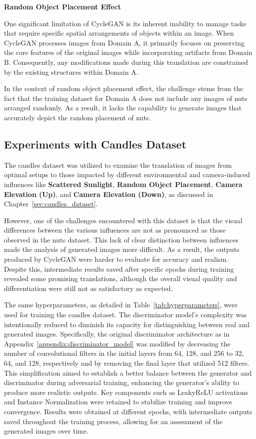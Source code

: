 \documentclass[12pt,DIV14,BCOR12mm,a4paper,footinclude=false,headinclude,parskip=half-,twoside,openright,cleardoublepage=empty,toc=index,bibliography=totoc,listof=totoc]{scrreprt}
\numberwithin{equation}{chapter}
\begin{document}
\textbf{Random Object Placement Effect}

One significant limitation of CycleGAN is its inherent inability to manage tasks that require specific spatial arrangements of objects within an image. When CycleGAN processes images from Domain A, it primarily focuses on preserving the core features of the original images while incorporating artifacts from Domain B. Consequently, any modifications made during this translation are constrained by the existing structures within Domain A.

In the context of random object placement effect, the challenge stems from the fact that the training dataset for Domain A does not include any images of nuts arranged randomly. As a result, it lacks the capability to generate images that accurately depict the random placement of nuts.

\subsection{Experiments with Candles Dataset}

The candles dataset was utilized to examine the translation of images from optimal setups to those impacted by different environmental and camera-induced influences like \textbf{Scattered Sunlight}, \textbf{Random Object Placement}, \textbf{Camera Elevation (Up)}, and \textbf{Camera Elevation (Down)}, as discussed in Chapter~\ref{sec:candles_dataset}.

However, one of the challenges encountered with this dataset is that the visual differences between the various influences are not as pronounced as those observed in the nuts dataset. This lack of clear distinction between influences made the analysis of generated images more difficult. As a result, the outputs produced by CycleGAN were harder to evaluate for accuracy and realism. Despite this, intermediate results saved after specific epochs during training revealed some promising translations, although the overall visual quality and differentiation were still not as satisfactory as expected.

The same hyperparameters, as detailed in Table~\ref{tab:hyperparameters}, were used for training the candles dataset. The discriminator model's complexity was intentionally reduced to diminish its capacity for distinguishing between real and generated images. Specifically, the original discriminator architecture as in Appendix~\ref{appendix:discriminator_model} was modified by decreasing the number of convolutional filters in the initial layers from 64, 128, and 256 to 32, 64, and 128, respectively and by removing the final layer that utilized 512 filters. This simplification aimed to establish a better balance between the generator and discriminator during adversarial training, enhancing the generator's ability to produce more realistic outputs. Key components such as LeakyReLU activations and Instance Normalization were retained to stabilize training and improve convergence. Results were obtained at different epochs, with intermediate outputs saved throughout the training process, allowing for an assessment of the generated images over time. 
\end{document}
